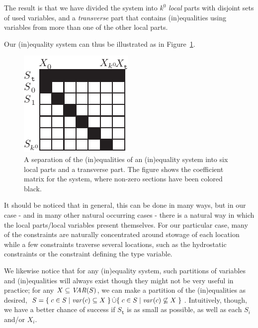 The result is that we have divided the system into $k^0$ \emph{local} parts with disjoint sets of used variables, and a \emph{transverse} part that contains (in)equalities using variables from more than one of the other local parts. 

Our (in)equality system can thus be illustrated as in Figure~\ref{fig:decomp1}.
\begin{figure}
	\centering
		\includegraphics{figures/decomp1B.pdf}
	\caption{A separation of the (in)equalities of an (in)equality system into six local parts and a transverse part. 
	The figure shows the coefficient matrix for the system, where non-zero sections have been colored black.}
	\label{fig:decomp1}
\end{figure}

It should be noticed that in general, this can be done in many ways, but in our case - and in many other natural occurring cases - there is a natural way in which the local parts/local variables present themselves. For our particular case, many of the constraints are naturally concentrated around stowage of each location while a few constraints traverse several locations, such as the hydrostatic constraints or the constraint defining the type variable.
   
We likewise notice that for any (in)equality system, such partitions of variables and (in)equalities will always exist though they might not be very useful in practice; 
for any $X\subseteq \mathit{VAR}(S)$, we can make a partition of the (in)equalities as desired, $S = \{\;{c\in S}\;|\;{\mathit{var}(c)\subseteq X}\;\}\,\dot\cup \{\;{c\in S}\;|\;{\mathit{var}(c)\not\subseteq X}\;\}$.
Intuitively, though, we have a better chance of success if $S_\texttt{t}$ is as small as possible, as well as each $S_i$ and/or $X_i$.


